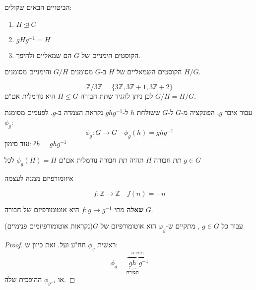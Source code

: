 \documentclass{tstextbook}
\begin{document}
\begin{proposition}
הביטויים הבאים שקולים:

  \begin{enumerate}
    \item \(H   \trianglelefteq G\)


    \item \(gHg^{-1}=H\)


    \item הקוסטים הימניים של \(G\) הם שמאליים ולהיפך. 


  \end{enumerate}
\end{proposition}
\begin{symbolize}
הקוסטים השמאליים של \(H\) ב-\(G\) מסומנים \(G/H\) והימניים מסומנים \(H/G\).

\end{symbolize}
\begin{example}
$$\mathbb{Z}/3\mathbb{Z}=\{ 3\mathbb{Z},3\mathbb{Z}+1,3\mathbb{Z}+2 \}$$
לכן ניתן להגיד שתת חבורה \(H\leq G\) היא נורמלית אם"ם \(G/H=H/G\).

\end{example}
\begin{definition}[הצמדה]
עבור איבר \(g\), הפונקציה מ-\(G\) ל-\(G\) ששולחת \(h\) ל-\(ghg^{-1}\)  נקראת הצמדה ב-\(g\).
לפעמים מסומנת \(\phi_{g}\):
$$\phi_{g}:G\to G \quad \phi_{g}(h)=ghg^{-1}$$
עוד סימון: \(^{g}h=ghg^{-1}\)

\end{definition}
\begin{corollary}
תת חבורה \(H\) תהיה תת חבורה נורמלית אם"ם \(\phi_{g}(H)=H\)  לכל \(g\in G\)

\end{corollary}
\begin{definition}[אוטומורפיזם]
איזומורפיזם ממנה לעצמה

\end{definition}
\begin{example}
$$f:\mathbb{Z}\to \mathbb{Z}\quad f(n)=-n$$

\end{example}
\textbf{שאלה}
מתי \(f:g\to g^{-1}\) היא אוטומורפיזם של חבורה \(G\).

\begin{proposition}
עבור כל \(g\in G\) , מתקיים ש-\(\varphi_{g}\) הוא אוטומורפיזם של \(G\)(נקראות אוטומורפיזמים פנימיים)

\end{proposition}
\begin{proof}
ראשית \(\phi_{g}\) חח"ע ועל. זאת כיוון ש:
$$\phi_{g}=\overbrace{\underbrace{ gh }_{ הרומת } g^{-1}}^{הרומת}$$
 או \(\phi_{g^{-1}}\) ההופכית שלה. 

\end{proof}
\end{document}
